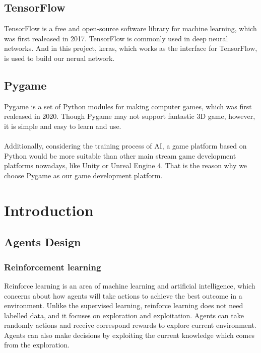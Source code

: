 \documentclass[14pt]{extarticle}
\begin{document}
\subsection{TensorFlow}
TensorFlow is a free and open-source software library for machine learning, which was first realeased in 2017. TensorFlow is commonly used in deep neural networks. And in this project, keras, which works as the interface for TensorFlow, is used to build our nerual network.

\subsection{Pygame}
Pygame is a set of Python modules for making computer games, which was first realeased in 2020. Though Pygame may not support fantastic 3D game, however, it is simple and easy to learn and use.\\\\
Additionally, considering the training process of AI, a game platform based on Python would be more suitable than other main stream game development platforms nowadays, like Unity or Unreal Engine 4. That is the reason why we choose Pygame as our game development platform.



\section{Introduction}

\subsection{Agents Design}
\subsubsection{Reinforcement learning}

Reinforce learning is an area of machine learning and artificial intelligence, which concerns about how agents will take actions to achieve the best outcome in a environment. Unlike the supervised learning, reinforce learning does not need labelled data, and it focuses on exploration and exploitation. Agents can take randomly actions and receive correspond rewards to explore current environment. Agents can also make decisions by exploiting the current knowledge which comes from the exploration.
\end{document}
